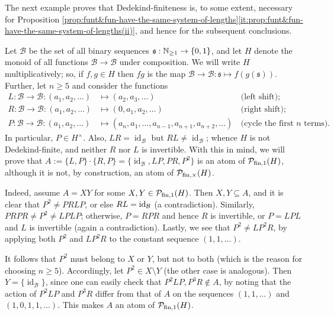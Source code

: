 %
The next example proves that Dedekind-finiteness is, to some extent, necessary for Proposition \ref{prop:funt&fun-have-the-same-system-of-lengths}\ref{it:prop:funt&fun-have-the-same-system-of-lengths(ii)}, and hence for the subsequent conclusions. 
%
\begin{eg}\label{exa:no-dedekind-finiteness}
Let $\mathcal{B}$ be the set of all binary sequences $\mathfrak{s}: \mathbb{N}_{\ge1} \to \{0,1\}$, and let $H$ denote the monoid of all functions $\mathcal{B} \to \mathcal{B}$ under composition.  We will write $H$ multiplicatively; so, if $f, g \in H$ then $fg$ is the map $\mathcal{B} \to \mathcal{B}: \mathfrak{s} \mapsto f(g(\mathfrak s))$.
Further, let $n\ge 5$ and consider the functions 
\begin{align*}
L: \mathcal{B} \to\mathcal{B}: (a_1,a_2,\dots) &\mapsto (a_2,a_3,\dots)  &\,\textrm{(left shift);}\\
R: \mathcal{B} \to\mathcal{B}: (a_1,a_2,\dots) &\mapsto (0,a_1,a_2,\dots) &\,\textrm{(right shift);}\\
P: \mathcal{B} \to\mathcal{B}: (a_1,a_2,\dots) &\mapsto (a_{n},a_1,\dots, a_{n-1}, {a_{n+1}, a_{n+2}},\ldots) &\,\textrm{(cycle the first $n$ terms).}
\end{align*}
%
In particular, $P \in H^\times$. Also, $LR = \operatorname{id}_\mathcal{B}$ but $RL \neq \operatorname{id}_\mathcal{B}$; whence $H$ is not Dedekind-finite, and neither $R$ nor $L$ is invertible. With this in mind, we will prove that $A:= \{L,P\} \cdot \{R,P\} = \{\operatorname{id}_\mathcal{B}, LP, PR, P^2 \}$ is an atom of $\mathcal{P}_{\textrm{fin}, 1}(H)$, although it is not, by construction, an atom of $\mathcal{P}_{\textrm{fin}, \times}(H)$.

Indeed,
assume $A = XY$ for some $X,Y\in \mathcal{P}_{\textrm{fin}, 1}(H)$.
Then $X,Y\subseteq A$, and it is clear that $P^2 \ne PRLP$, or else $RL = {\rm id}_\mathcal{B}$ (a contradiction). Similarly, $PRPR \ne P^2 \ne LPLP$; otherwise, $P = RPR$ and hence $R$ is invertible, or $P = LPL$ and $L$ is invertible (again a contradiction). Lastly, we see that $P^2 \ne LP^2 R$, by applying both $P^2$ and $LP^2 R$ to the constant sequence $(1, 1, \ldots)$.

It follows that $P^2$ must belong to $X$ or $Y$, but not to both (which is the reason for choosing $n\ge 5$).
Accordingly, let $P^2 \in X \setminus Y$ (the other case is analogous).
Then $Y = \{\operatorname{id}_\mathcal{B}\}$, since one can easily check that $P^2LP, P^3R \notin A$, by noting that the action of $P^2LP$ and $P^3R$ differ from that of $A$ on the sequences $(1,1,\ldots)$ and $(1,0,1,1,\ldots)$. This makes $A$ an atom of $\mathcal{P}_{\textrm{fin}, 1}(H)$.
\end{eg}

